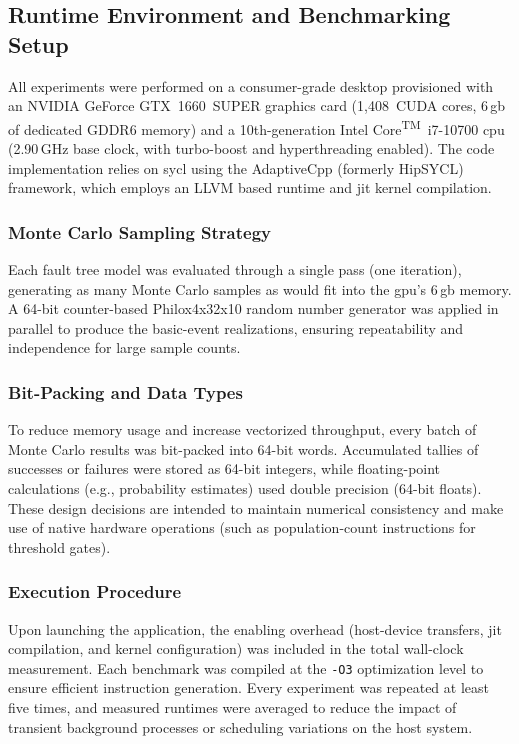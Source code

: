 \subsection{Runtime Environment and Benchmarking Setup}
\label{subsec:runtime_environment}

All experiments were performed on a consumer-grade desktop provisioned with an NVIDIA\textsuperscript{\textregistered} GeForce GTX~1660~SUPER graphics card (1{,}408~CUDA cores, 6\,\acrshort{gb} of dedicated GDDR6 memory) and a 10th-generation Intel\textsuperscript{\textregistered} Core\textsuperscript{TM}~i7-10700 \acrshort{cpu} (2.90\,GHz base clock, with turbo-boost and hyperthreading enabled). The code implementation relies on \acrshort{sycl} using the AdaptiveCpp (formerly HipSYCL) framework, which employs an LLVM based runtime and \acrfull{jit} kernel compilation.

\subsubsection*{Monte Carlo Sampling Strategy}
Each fault tree model was evaluated through a single pass (one iteration), generating as many Monte Carlo samples as would fit into the \acrshort{gpu}’s 6\,\acrshort{gb} memory. A 64-bit counter-based Philox4x32x10 random number generator was applied in parallel to produce the basic-event realizations, ensuring repeatability and independence for large sample counts.

\subsubsection*{Bit-Packing and Data Types}
To reduce memory usage and increase vectorized throughput, every batch of Monte Carlo results was bit-packed into 64-bit words. Accumulated tallies of successes or failures were stored as 64-bit integers, while floating-point calculations (e.g., probability estimates) used double precision (64-bit floats). These design decisions are intended to maintain numerical consistency and make use of native hardware operations (such as population-count instructions for threshold gates).

\subsubsection*{Execution Procedure}
Upon launching the application, the enabling overhead (host-device transfers, \acrshort{jit} compilation, and kernel configuration) was included in the total wall-clock measurement. Each benchmark was compiled at the \texttt{-O3} optimization level to ensure efficient instruction generation. Every experiment was repeated at least five times, and measured runtimes were averaged to reduce the impact of transient background processes or scheduling variations on the host system.

